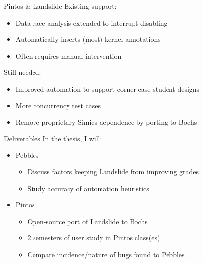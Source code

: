 \documentclass[xcolor=dvipsnames]{beamer}
\begin{document}
\begin{frame}{Pintos \& Landslide}
	Existing support:
	\begin{itemize}
		\item Data-race analysis
			extended to interrupt-disabling
		\item Automatically inserts (most) kernel annotations
		\item Often requires manual intervention
	\end{itemize}
	\linegap

	Still needed:
	\begin{itemize}
		\item Improved automation to support corner-case student designs
		\item More concurrency test cases
		\item Remove proprietary Simics dependence by porting to Bochs
	\end{itemize}
\end{frame}

\begin{frame}{Deliverables}
	In the thesis, I will:
	\begin{itemize}
		\item Pebbles
		\begin{itemize}
			\item Discuss factors keeping Landslide from improving grades
			\item Study accuracy of automation heuristics
		\end{itemize}
		\item Pintos
		\begin{itemize}
			\item Open-source port of Landslide to Bochs
			\item 2 semesters of user study in Pintos class(es)
			\item Compare incidence/nature of bugs found to Pebbles
		\end{itemize}
	\end{itemize}
\end{frame}

\end{document}
